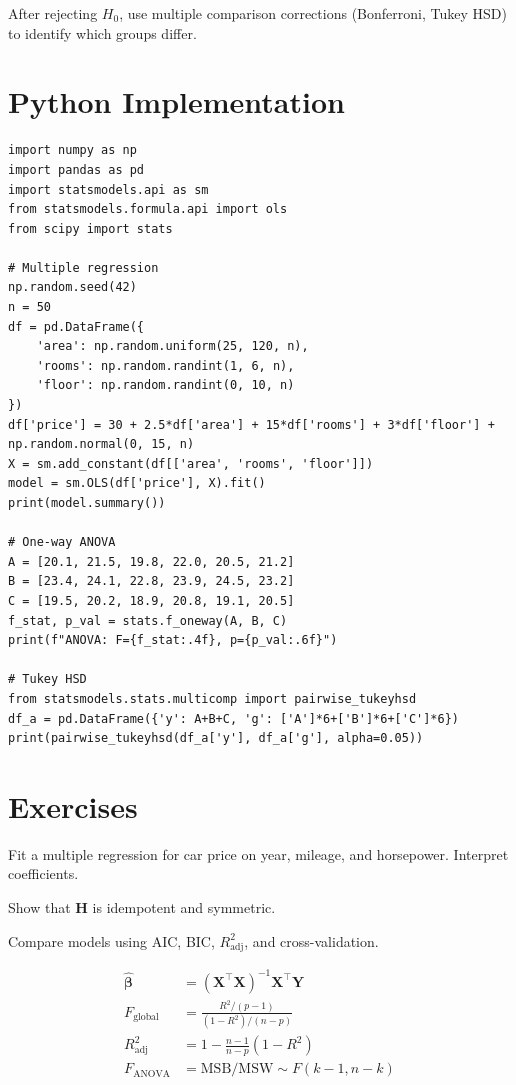 \begin{warning}
After rejecting $H_0$, use multiple comparison corrections (Bonferroni, Tukey HSD) to identify which groups differ.
\end{warning}

\section{Python Implementation}

\begin{python}
\begin{verbatim}
import numpy as np
import pandas as pd
import statsmodels.api as sm
from statsmodels.formula.api import ols
from scipy import stats

# Multiple regression
np.random.seed(42)
n = 50
df = pd.DataFrame({
    'area': np.random.uniform(25, 120, n),
    'rooms': np.random.randint(1, 6, n),
    'floor': np.random.randint(0, 10, n)
})
df['price'] = 30 + 2.5*df['area'] + 15*df['rooms'] + 3*df['floor'] + np.random.normal(0, 15, n)
X = sm.add_constant(df[['area', 'rooms', 'floor']])
model = sm.OLS(df['price'], X).fit()
print(model.summary())

# One-way ANOVA
A = [20.1, 21.5, 19.8, 22.0, 20.5, 21.2]
B = [23.4, 24.1, 22.8, 23.9, 24.5, 23.2]
C = [19.5, 20.2, 18.9, 20.8, 19.1, 20.5]
f_stat, p_val = stats.f_oneway(A, B, C)
print(f"ANOVA: F={f_stat:.4f}, p={p_val:.6f}")

# Tukey HSD
from statsmodels.stats.multicomp import pairwise_tukeyhsd
df_a = pd.DataFrame({'y': A+B+C, 'g': ['A']*6+['B']*6+['C']*6})
print(pairwise_tukeyhsd(df_a['y'], df_a['g'], alpha=0.05))
\end{verbatim}
\end{python}

\section{Exercises}

\begin{exercise}[$\star$]
Fit a multiple regression for car price on year, mileage, and horsepower. Interpret coefficients.
\end{exercise}

\begin{exercise}[$\star\star$]
Show that $\mathbf{H}$ is idempotent and symmetric.
\end{exercise}

\begin{exercise}
Compare models using AIC, BIC, $R^2_{\mathrm{adj}}$, and cross-validation.
\end{exercise}

\begin{keyformulas}
\begin{align*}
\hat{\bm{\beta}} &= (\mathbf{X}^\top\mathbf{X})^{-1}\mathbf{X}^\top\mathbf{Y} \\
F_{\text{global}} &= \frac{R^2/(p-1)}{(1-R^2)/(n-p)} \\
R^2_{\mathrm{adj}} &= 1-\frac{n-1}{n-p}(1-R^2) \\
F_{\text{ANOVA}} &= \text{MSB}/\text{MSW} \sim F(k-1,n-k)
\end{align*}
\end{keyformulas}
